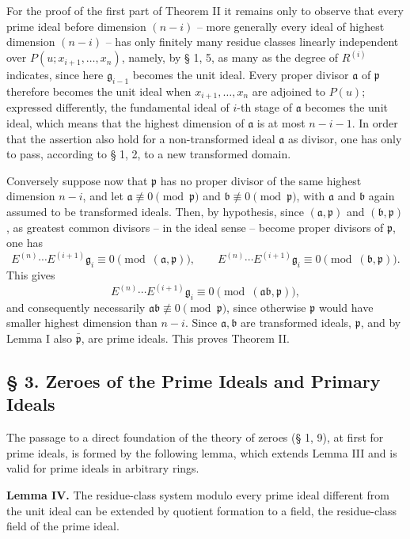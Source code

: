 \documentclass[11pt]{article}
\providecommand{\frakp}{\mathfrak p}
\providecommand{\fraka}{\mathfrak a}
\providecommand{\frakb}{\mathfrak b}
\providecommand{\frakb}{\mathfrak b}
\providecommand{\frakg}{\mathfrak g}
\begin{document}
For the proof of the first part of Theorem II it remains only to observe that every prime ideal before dimension $(n-i)$ -- more generally every ideal of highest dimension $(n-i)$ -- has only finitely many residue classes linearly independent over $P(u;x_{i+1},\ldots,x_n)$, namely, by § 1, 5, as many as the degree of $R^{(i)}$ indicates, since here $\frakg_{i-1}$ becomes the unit ideal. Every proper divisor $\fraka$ of $\frakp$ therefore becomes the unit ideal when $x_{i+1},\ldots,x_n$ are adjoined to $P(u)$; expressed differently, the fundamental ideal of $i$-th stage of $\fraka$ becomes the unit ideal, which means that the highest dimension of $\fraka$ is at most $n-i-1$. In order that the assertion also hold for a non-transformed ideal $\fraka$ as divisor, one has only to pass, according to § 1, 2, to a new transformed domain.

Conversely suppose now that $\frakp$ has no proper divisor of the same highest dimension $n-i$, and let $\fraka\not\equiv0\pmod{\frakp}$ and $\frakb\not\equiv0\pmod{\frakp}$, with $\fraka$ and $\frakb$ again assumed to be transformed ideals. Then, by hypothesis, since $(\fraka,\frakp)$ and $(\frakb,\frakp)$, as greatest common divisors -- in the ideal sense -- become proper divisors of $\frakp$, one has
\[
 E^{(n)}\cdots E^{(i+1)}\frakg_i\equiv0\pmod{(\fraka,\frakp)},
\qquad
 E^{(n)}\cdots E^{(i+1)}\frakg_i\equiv0\pmod{(\frakb,\frakp)}.
\]
This gives
\[
 E^{(n)}\cdots E^{(i+1)}\frakg_i\equiv0\pmod{(\fraka\frakb,\frakp)},
\]
and consequently necessarily $\fraka\frakb\not\equiv0\pmod{\frakp}$, since otherwise $\frakp$ would have smaller highest dimension than $n-i$. Since $\fraka,\frakb$ are transformed ideals, $\frakp$, and by Lemma I also $\bar{\frakp}$, are prime ideals. This proves Theorem II.

\subsection*{§ 3. Zeroes of the Prime Ideals and Primary Ideals}

The passage to a direct foundation of the theory of zeroes (§ 1, 9), at first for prime ideals, is formed by the following lemma, which extends Lemma III and is valid for prime ideals in arbitrary rings.

\textbf{Lemma IV.} The residue-class system modulo every prime ideal different from the unit ideal can be extended by quotient formation to a field, the residue-class field of the prime ideal.
\end{document}
